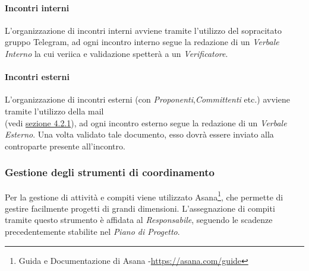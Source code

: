\paragraph{Incontri interni} L'organizzazione di incontri interni avviene tramite l'utilizzo del sopracitato gruppo Telegram, ad ogni incontro interno segue la redazione di un \textit{Verbale Interno} la cui veriica e validazione spetterà a un \textit{Verificatore}.
\paragraph{Incontri esterni}\label{Com esterne} L'organizzazione di incontri esterni (con \textit{Proponenti},\textit{Committenti} etc.) avviene tramite l'utilizzo della mail \\ \mailleaf (vedi \hyperref[Com esterne]{sezione 4.2.1}), ad ogni incontro esterno segue la redazione di un \textit{Verbale Esterno}. Una volta validato tale documento, esso dovrà essere inviato alla controparte presente all'incontro.

\subsubsection{Gestione degli strumenti di coordinamento} Per la gestione di attività e compiti viene utilizzato Asana\footnote{Guida e Documentazione di Asana -\url{https://asana.com/guide}}, che permette di gestire facilmente progetti di grandi dimensioni.
L'assegnazione di compiti tramite questo strumento è affidata al \textit{Responsabile}, seguendo le scadenze precedentemente stabilite nel \textit{Piano di Progetto}.